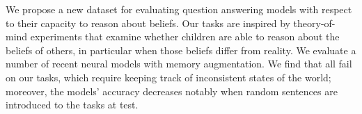 We propose a new dataset for evaluating question answering models with respect to their capacity to reason about beliefs. Our tasks are inspired by theory-of-mind experiments that examine whether children are able to reason about the beliefs of others, in particular when those beliefs differ from reality. We evaluate a number of recent neural models with memory augmentation. We find that all fail on our tasks, which require keeping track of inconsistent states of the world; moreover, the models' accuracy decreases notably when random sentences are introduced to the tasks at test.
